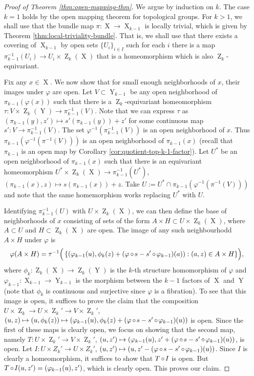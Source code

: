 \documentclass[a4paper,12pt,reqno]{amsart}
\theoremstyle{definition}
\def\to{\rightarrow}
\DeclareMathOperator{\ab}{Z}
\DeclareMathOperator{\ns}{X}
\DeclareMathOperator{\nss}{Y}
\DeclareMathOperator{\co}{\circ\hspace{-0.02 cm}}
\begin{document}
\begin{proof}[Proof of Theorem \ref{thm:open-mapping-thm}]
We argue by induction on $k$. The case $k=1$ holds by the open mapping theorem for topological groups. For $k>1$, we shall use that the bundle map $\pi:\ns\to\ns_{k-1}$ is locally trivial, which is given by Theorem \ref{thm:local-triviality-bundle}. That is, we shall use that there exists a covering of $\ns_{k-1}$ by open sets $\{U_i\}_{i\in I}$ such for each $i$ there is a map $\pi_{k-1}^{-1}(U_i)\to  U_i \times\ab_k(\ns)$ that is a homeomorphism which is also $\ab_k$-equivariant.

Fix any $x\in\ns$. We now show that for small enough neighborhoods of $x$, their images under $\varphi$ are open. Let $V\subset \nss_{k-1}$ be any open neighborhood of $\pi_{k-1}(\varphi(x))$ such that there is a $\ab_k$-equivariant homeomorphism $\tau:V\times \ab_k(\nss)\to \pi_{k-1}^{-1}(V)$.  Note that we can express $\tau$ as $(\pi_{k-1}(y),z')\mapsto s'(\pi_{k-1}(y))+z'$ for some continuous map $s':V\to \pi_{k-1}^{-1}(V)$.  The set $\varphi^{-1}(\pi_{k-1}^{-1}(V))$ is an open neighborhood of $x$. Thus $\pi_{k-1}(\varphi^{-1}(\pi^{-1}(V)))$ is an open neighborhood of $\pi_{k-1}(x)$ (recall that $\pi_{k-1}$ is an open map by Corollary \ref{cor:quotient-top-k-1-factor}). Let $U^*$ be an open neighborhood of $\pi_{k-1}(x)$ such that there is an equivariant homeomorphism $U^*\times \ab_k(\ns)\to \pi_{k-1}^{-1}(U^*)$, $(\pi_{k-1}(x),z)\mapsto s(\pi_{k-1}(x))+z$. Take $U:=U^*\cap \pi_{k-1}(\varphi^{-1}(\pi^{-1}(V)))$ and note that the same homemorphism works replacing $U^*$ with $U$.

Identifying $\pi_{k-1}^{-1}(U)$ with $U\times \ab_k(\ns)$, we can then define the base of neighborhoods of $x$ consisting of sets of the form $A\times H\subset U\times \ab_k(\ns)$, where $A\subset U$ and $H\subset \ab_k(\ns)$ are open. The image of any such neighbourhodd $A\times H$ under $\varphi$ is
\[
\varphi(A\times H)=\tau^{-1}\Big(\,\{(\varphi_{k-1}(u),\phi_k(z)+(\varphi\co s-s'\co \varphi_{k-1})(a)): (a,z)\in A\times H\}\Big),
\]
where $\phi_k:\ab_k(\ns)\to\ab_k(\nss)$ is the $k$-th structure homomorphism of $\varphi$ and $\varphi_{k-1}:\ns_{k-1}\to\nss_{k-1}$ is the morphism between the $k-1$ factors of $\ns$ and $\nss$ (note that $\phi_k$ is continuous and surjective since $\varphi$ is a fibration). To see that this image is open, it suffices to prove the claim that the composition $U\times \ab_k\to U\times \ab_k'\to V\times \ab_k'$, $(u,z)\mapsto (u,\phi_k(z))\mapsto (\varphi_{k-1}(u),\phi_k(z)+(\varphi\co s-s'\co \varphi_{k-1})(u))$ is open. Since the first of these maps is clearly open, we focus on showing that the second map, namely 
$T:U\times \ab_k'\to V\times \ab_k'$, $(u,z')\mapsto (\varphi_{k-1}(u),z'+(\varphi\co s-s'\co \varphi_{k-1})(u))$, is open. Let  $I:U\times Z_k'\to U\times Z_k'$,  $(u,z')\mapsto (u,z'-(\varphi\co s-s'\co \varphi_{k-1})(u))$. Since $I$ is clearly a  homeomorphism, it suffices to show that $T\co I$ is open. But $T\co I(u,z')=(\varphi_{k-1}(u),z')$, which is clearly open. This proves our claim.


\end{proof}
\end{document}
